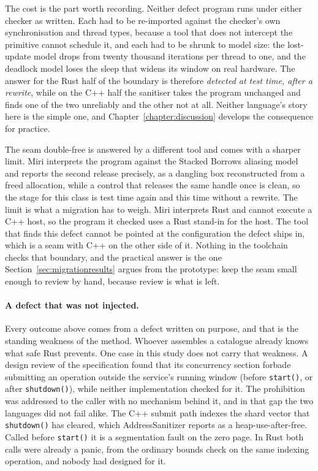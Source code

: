 \documentclass[english,oneside,a4paper,censored,csm,software-track-2020]{HYthesisML}
\begin{document}
The cost is the part worth recording. Neither defect program runs under either checker as
written. Each had to be re-imported against the checker's own synchronisation and thread types,
because a tool that does not intercept the primitive cannot schedule it, and each had to be
shrunk to model size: the lost-update model drops from twenty thousand iterations per thread to
one, and the deadlock model loses the sleep that widens its window on real hardware. The answer
for the Rust half of the boundary is therefore \emph{detected at test time, after a rewrite},
while on the C++ half the sanitiser takes the program unchanged and finds one of the two
unreliably and the other not at all. Neither language's story here is the simple one, and
Chapter~\ref{chapter:discussion} develops the consequence for practice.

The seam double-free is answered by a different tool and comes with a sharper limit. Miri
interprets the program against the Stacked Borrows aliasing model and reports the second
release precisely, as a dangling box reconstructed from a freed allocation, while a control that
releases the same handle once is clean, so the stage for this class is test time again and this
time without a rewrite. The limit is what a migration has to weigh. Miri interprets Rust and
cannot execute a C++ host, so the program it checked uses a Rust stand-in for the host. The tool
that finds this defect cannot be pointed at the configuration the defect ships in, which is a
seam with C++ on the other side of it. Nothing in the toolchain checks that boundary, and the
practical answer is the one Section~\ref{sec:migrationresults} argues from the prototype: keep
the seam small enough to review by hand, because review is what is left.

\paragraph{A defect that was not injected.}
Every outcome above comes from a defect written on purpose, and that is the standing weakness of
the method. Whoever assembles a catalogue already knows what safe Rust prevents. One case in
this study does not carry that weakness. A design review of the specification found that its
concurrency section forbade submitting an operation outside the service's running window
(before \texttt{start()}, or after \texttt{shutdown()}), while neither implementation checked
for it. The prohibition was addressed to the caller with no mechanism behind it, and in that gap
the two languages did not fail alike. The C++ submit path indexes the shard vector that
\texttt{shutdown()} has cleared, which AddressSanitizer reports as a heap-use-after-free. Called
before \texttt{start()} it is a segmentation fault on the zero page. In Rust both calls were
already a panic, from the ordinary bounds check on the same indexing operation, and nobody had
designed for it.
\end{document}
